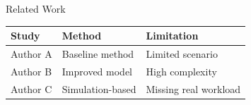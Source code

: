 \begin{frame}{Related Work}

\begin{center}
\begin{tabular}{lll}
\toprule
\textbf{Study} & \textbf{Method} & \textbf{Limitation} \\
\midrule
Author A & Baseline method & Limited scenario \\
Author B & Improved model & High complexity \\
Author C & Simulation-based & Missing real workload \\
\bottomrule
\end{tabular}
\end{center}

\vspace{0.35cm}


\end{frame}
